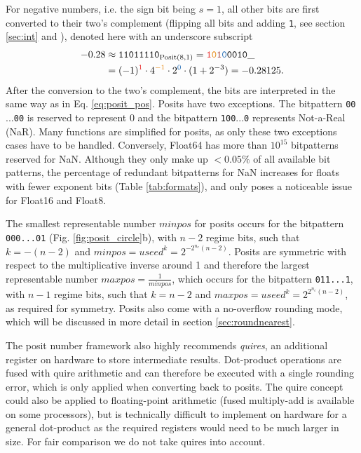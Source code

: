 For negative numbers, i.e. the sign bit being $s=1$, all other bits are first converted to their two's complement (flipping all bits and adding \texttt{1}, 
see section \ref{sec:int} and \cite{Choo2003}), denoted here with an underscore subscript
\begin{equation}
\begin{split}
-0.28 &  \approx \mathtt{11011110}_{\op{Posit}(8,1)} = \mathtt{{\color{psign}1}{\color{pregime}0}{\color{pregimet}1}{\color{pexpo}0}0010}\_ \\
& = (-1)^{\color{psign}1} \cdot 4^{\color{pregime}-1} \cdot 2^{\color{pexpo}0} \cdot (1+2^{-3}) = -0.28125.
\end{split}
\label{eq:2comp}
\end{equation}
After the conversion to the two's complement, the bits are interpreted in the same way as in Eq. \ref{eq:posit_pos}. Posits have two exceptions.
The bitpattern \texttt{00$...$00} is reserved to represent 0 and the bitpattern \texttt{100$...$0} represents Not-a-Real (NaR). Many functions
are simplified for posits, as only these two exceptions cases have to be handled. Conversely, Float64 has more than
$10^{15}$ bitpatterns reserved for NaN. Although they only make up $< 0.05\%$ of all available bit patterns, the percentage of redundant
bitpatterns for NaN increases for floats with fewer exponent bits (Table \ref{tab:formats}), and only poses a noticeable issue for Float16
and Float8.

The smallest representable number $minpos$ for posits occurs for the bitpattern \texttt{{\color{psign}0}{\color{pregime}00...0}{\color{pregimet}1}}
(Fig. \ref{fig:posit_circle}b), with $n-2$ regime bits, such that $k = -(n-2)$ and $minpos = useed^k = 2^{-2^{n_e}(n-2)}$. Posits are symmetric with respect
to the multiplicative inverse around 1 and therefore the largest representable number $maxpos =  \tfrac{1}{minpos}$, which occurs for 
the bitpattern \texttt{{\color{psign}0}{\color{pregime}11...1}}, with $n-1$ regime bits, such that $k=n-2$ and $maxpos = useed^k = 2^{2^{n_e}(n-2)}$,
as required for symmetry. Posits also come with a no-overflow rounding mode, which will be discussed in more detail
in section \ref{sec:roundnearest}.

The posit number framework also highly recommends \emph{quires}, an additional register on hardware to store intermediate results.
Dot-product operations are fused with quire arithmetic and can therefore be executed with a single rounding error, which is only applied
when converting back to posits. The quire concept could also be applied to floating-point arithmetic (fused multiply-add is available on
some processors), but is technically difficult to implement on hardware for a general dot-product as the required registers would need
to be much larger in size. For fair comparison we do not take quires into account. 


